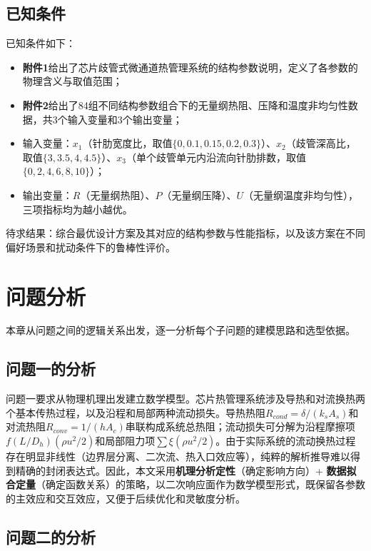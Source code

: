 \documentclass[12pt,a4paper]{ctexart}
\begin{document}
\subsection{已知条件}

已知条件如下：
\begin{itemize}
\item \textbf{附件1}给出了芯片歧管式微通道热管理系统的结构参数说明，定义了各参数的物理含义与取值范围；
\item \textbf{附件2}给出了84组不同结构参数组合下的无量纲热阻、压降和温度非均匀性数据，共3个输入变量和3个输出变量；
\item 输入变量：$x_1$（针肋宽度比，取值$\{0,0.1,0.15,0.2,0.3\}$）、$x_2$（歧管深高比，取值$\{3,3.5,4,4.5\}$）、$x_3$（单个歧管单元内沿流向针肋排数，取值$\{0,2,4,6,8,10\}$）；
\item 输出变量：$R$（无量纲热阻）、$P$（无量纲压降）、$U$（无量纲温度非均匀性），三项指标均为越小越优。
\end{itemize}

待求结果：综合最优设计方案及其对应的结构参数与性能指标，以及该方案在不同偏好场景和扰动条件下的鲁棒性评价。

\section{问题分析}

本章从问题之间的逻辑关系出发，逐一分析每个子问题的建模思路和选型依据。

\subsection{问题一的分析}

问题一要求从物理机理出发建立数学模型。芯片热管理系统涉及导热和对流换热两个基本传热过程，以及沿程和局部两种流动损失。导热热阻$R_{cond} = \delta/(k_s A_s)$和对流热阻$R_{conv} = 1/(h A_c)$串联构成系统总热阻；流动损失可分解为沿程摩擦项$f(L/D_h)(\rho u^2/2)$和局部阻力项$\sum\xi(\rho u^2/2)$。由于实际系统的流动换热过程存在明显非线性（边界层分离、二次流、热入口效应等），纯粹的解析推导难以得到精确的封闭表达式。因此，本文采用\textbf{机理分析定性}（确定影响方向）+ \textbf{数据拟合定量}（确定函数关系）的策略，以二次响应面作为数学模型形式，既保留各参数的主效应和交互效应，又便于后续优化和灵敏度分析。

\subsection{问题二的分析}
\end{document}
